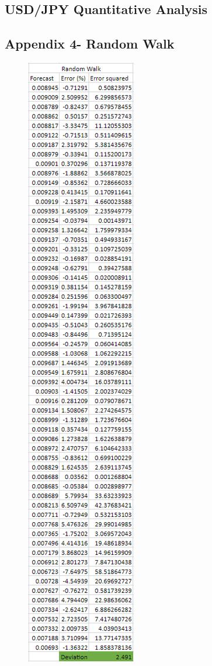 \documentclass{article}
\let\Oldsubsection\subsection
\renewcommand{\subsection}{\FloatBarrier\Oldsubsection}
\begin{document}
\FloatBarrier
\subsection*{USD/JPY Quantitative Analysis}

\subsection*{Appendix 4- Random Walk}


\begin{figure}[h!]
    \centering
    \includegraphics[scale=0.5]{graphs/app4.png}
\end{figure}
\end{document}
